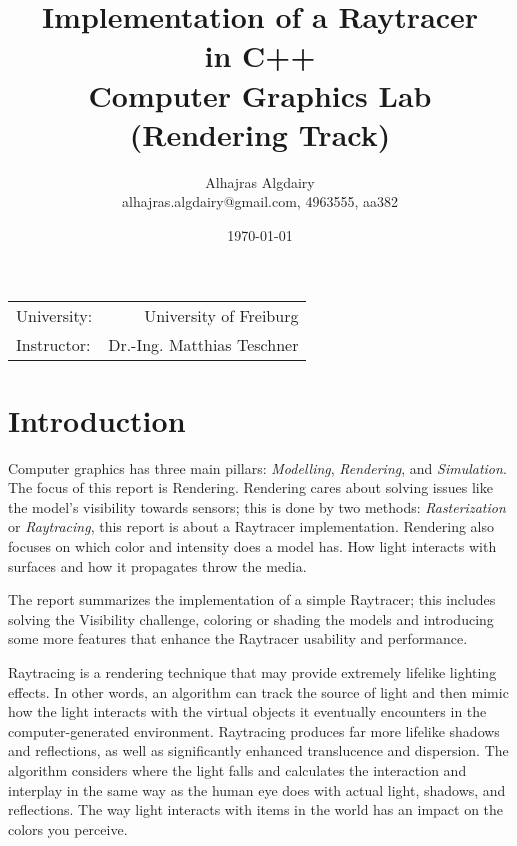 \documentclass{article}
\title{Implementation of a Raytracer \\ in C++ \\ Computer Graphics Lab (Rendering Track)} %
\author{Alhajras Algdairy \\alhajras.algdairy@gmail.com, 4963555, aa382} %
\date{\today} %
\begin{document}
	
	\maketitle %
	
	\begin{center}
		\begin{tabular}{l r}
			University: & University of Freiburg \\ %
			Instructor: &Dr.-Ing. Matthias Teschner %
		\end{tabular}
	\end{center}
	\clearpage
	
	\tableofcontents
	\clearpage
	\section{Introduction}
	Computer graphics has three main pillars: \textit{Modelling}, \textit{Rendering}, and \textit{Simulation}. The focus of this report is Rendering. Rendering cares about solving issues like the model's visibility towards sensors; this is done by two methods: \textit{Rasterization} or \textit{Raytracing}, this report is about a Raytracer implementation. Rendering also focuses on which color and intensity does a model has. How light interacts with surfaces and how it propagates throw the media.
	
	The report summarizes the implementation of a simple Raytracer; this includes solving the Visibility challenge, coloring or shading the models and introducing some more features that enhance the Raytracer usability and performance.
	
	\vspace*{5px}
	Raytracing is a rendering technique that may provide extremely lifelike lighting effects. In other words, an algorithm can track the source of light and then mimic how the light interacts with the virtual objects it eventually encounters in the computer-generated environment. Raytracing produces far more lifelike shadows and reflections, as well as significantly enhanced translucence and dispersion. The algorithm considers where the light falls and calculates the interaction and interplay in the same way as the human eye does with actual light, shadows, and reflections. The way light interacts with items in the world has an impact on the colors you perceive.
	
\end{document}
